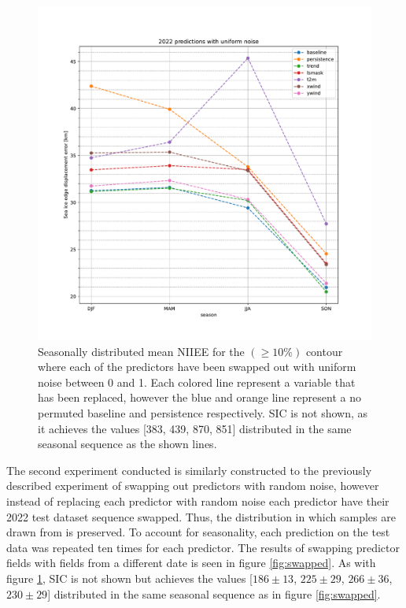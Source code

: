 \documentclass[../main/thesis.tex]{subfiles}
\begin{document}
\begin{figure}
    \centering
    \includegraphics[width=\textwidth]{noisy.pdf}
    \caption{\label{fig:noisy}Seasonally distributed mean NIIEE for the $(\geq10\%)$ contour where each of the predictors have been swapped out with uniform noise between 0 and 1. Each colored line represent a variable that has been replaced, however the blue and orange line represent a no permuted baseline and persistence respectively. SIC is not shown, as it achieves the values [383, 439, 870, 851] distributed in the same seasonal sequence as the shown lines.}
\end{figure}

The second experiment conducted is similarly constructed to the previously described experiment of swapping out predictors with random noise, however instead of replacing each predictor with random noise each predictor have their 2022 test dataset sequence swapped. Thus, the distribution in which samples are drawn from is preserved. To account for seasonality, each prediction on the test data was repeated ten times for each predictor. The results of swapping predictor fields with fields from a different date is seen in figure \ref{fig:swapped}. As with figure \ref{fig:noisy}, SIC is not shown but achieves the values [$186 \pm 13$, $225 \pm 29$, $266 \pm 36$, $230 \pm 29$] distributed in the same seasonal sequence as in figure \ref{fig:swapped}.
\end{document}
